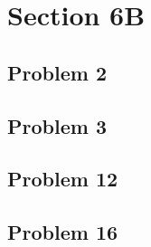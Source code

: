 \documentclass[11pt]{article}
\begin{document}

\section{Section 6B}


\subsection{Problem 2}


\subsection{Problem 3}


\subsection{Problem 12}


\subsection{Problem 16}

\end{document}
